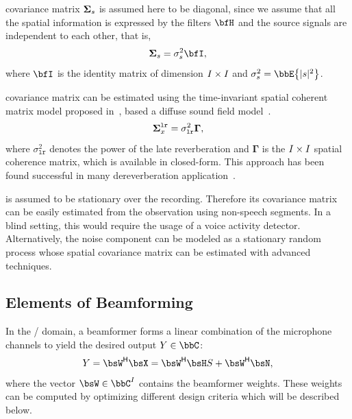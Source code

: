  covariance matrix $\boldsymbol{\Sigma}_{s}$ is assumed here to be diagonal, since we assume that all the spatial information is expressed by the filters $\FLTSS$ and the source signals are independent to each other, that is,
\begin{equation}
    \xpsd_\src = \sigma_\src^2 \bfI
    ,
\end{equation}
where $\bfI$ is the identity matrix of dimension $I \times I$ and $\sigma_\src^2 = \bbE\kbrace{\powerOf{\src}}$.

 covariance matrix can be estimated using the time-invariant spatial coherent matrix model proposed in~, based a diffuse sound field model~.
\begin{equation}\label{eq:dechorateapp:gamma}
    \boldsymbol{\Sigma}^{\mathtt{lr}}_{x} = \sigma_\mathtt{lr}^2\mathbf{\Gamma}
    ,
\end{equation}
where $\sigma_\mathtt{lr}^2$ denotes the power of the late reverberation and $\mathbf{\Gamma}$ is the $I \times I$ spatial coherence matrix, which is available in closed-form.
This approach has been found successful in many dereverberation application~.

 is assumed to be stationary over the recording.
Therefore its covariance matrix can be easily estimated from the observation using non-speech segments.
In a blind setting, this would require the usage of a voice activity detector.
Alternatively, the noise component can be modeled as a stationary random process whose spatial covariance matrix can be estimated with advanced techniques.

\subsection{Elements of Beamforming}\label{subsec:dechorateapp:beamformers}
In the \STFT/ domain, a beamformer forms a linear combination of the microphone channels to yield the desired output $Y \in \bbC$:
\begin{equation*}
    Y = \khermitian{\bsW} \MICS = \khermitian{\bsW} \FLTS \SRC + \khermitian{\bsW} \NSES,
\end{equation*}
where the vector $\bsW \in \bbC^{\numMics}$ contains the beamformer weights.
These weights can be computed by optimizing different design criteria which will be described below.

